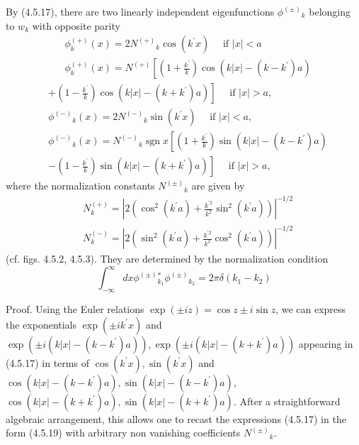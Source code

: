 \documentclass{article}
\begin{document}
By (4.5.17), there are two linearly independent eigenfunctions $\phi^{( \pm)}{ }_{k}$ belonging to $w_{k}$ with opposite parity
$$
\begin{align*}
& \phi_{k}^{(+)}(x)=2 N^{(+)}{ }_{k} \cos \left(k^{\prime} x\right) \quad \text { if }|x|<a  \tag{4.5.19a}\\
& \phi_{k}^{(+)}(x)=N^{(+)}\left[\left(1+\frac{k^{\prime}}{k}\right) \cos \left(k|x|-\left(k-k^{\prime}\right) a\right)\right. \tag{4.5.19b}
\end{align*}
$$
$$
\begin{align*}
& \left.+\left(1-\frac{k^{\prime}}{k}\right) \cos \left(k|x|-\left(k+k^{\prime}\right) a\right)\right] \quad \text { if }|x|>a, \\
& \phi^{(-)}{ }_{k}(x)=2 N^{(-)}{ }_{k} \sin \left(k^{\prime} x\right) \quad \text { if }|x|<a,  \tag{4.5.19c}\\
& \phi^{(-)}{ }_{k}(x)=N^{(-)}{ }_{k} \operatorname{sgn} x\left[\left(1+\frac{k^{\prime}}{k}\right) \sin \left(k|x|-\left(k-k^{\prime}\right) a\right)\right.  \tag{4.5.19d}\\
& \left.-\left(1-\frac{k^{\prime}}{k}\right) \sin \left(k|x|-\left(k+k^{\prime}\right) a\right)\right] \quad \text { if }|x|>a,
\end{align*}
$$
where the normalization constants $N^{( \pm)}{ }_{k}$ are given by
$$
\begin{align*}
& N_{k}^{(+)}=\left|2\left(\cos ^{2}\left(k^{\prime} a\right)+\frac{k^{\prime 2}}{k^{2}} \sin ^{2}\left(k^{\prime} a\right)\right)\right|^{-1 / 2}  \tag{4.5.20a}\\
& N_{k}^{(-)}=\left|2\left(\sin ^{2}\left(k^{\prime} a\right)+\frac{k^{\prime 2}}{k^{2}} \cos ^{2}\left(k^{\prime} a\right)\right)\right|^{-1 / 2} \tag{4.5.20b}
\end{align*}
$$
(cf. figs. 4.5.2, 4.5.3). They are determined by the normalization condition
$$
\begin{equation*}
\int_{-\infty}^{\infty} d x \phi^{( \pm)}{ }_{k_{1}}^{*} \phi^{( \pm)}{ }_{k_{2}}=2 \pi \delta\left(k_{1}-k_{2}\right) \tag{4.5.21}
\end{equation*}
$$

Proof. Using the Euler relations $\exp ( \pm i z)=\cos z \pm i \sin z$, we can express the exponentials $\exp \left( \pm i k^{\prime} x\right)$ and $\exp \left( \pm i\left(k|x|-\left(k-k^{\prime}\right) a\right)\right), \exp \left( \pm i\left(k|x|-\left(k+k^{\prime}\right) a\right)\right)$ appearing in (4.5.17) in terms of $\cos \left(k^{\prime} x\right), \sin \left(k^{\prime} x\right)$ and $\cos \left(k|x|-\left(k-k^{\prime}\right) a\right), \sin \left(k|x|-\left(k-k^{\prime}\right) a\right)$, $\cos \left(k|x|-\left(k+k^{\prime}\right) a\right), \sin \left(k|x|-\left(k+k^{\prime}\right) a\right)$. After a straightforward algebraic arrangement, this allows one to recast the expressions (4.5.17) in the form (4.5.19) with arbitrary non vanishing coefficients $N^{( \pm)}{ }_{k}$.
\end{document}
